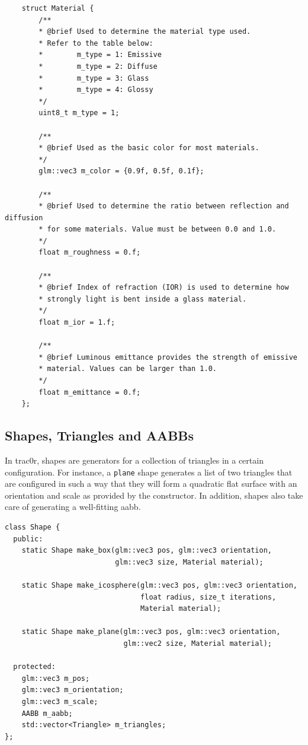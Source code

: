 \documentclass[
  twoside,
  11pt, a4paper,
  footinclude=true,
  headinclude=true,
  cleardoublepage=empty
]{scrreprt}
\begin{document}
\begin{verbatim}
    struct Material {
        /**
        * @brief Used to determine the material type used.
        * Refer to the table below:
        *        m_type = 1: Emissive
        *        m_type = 2: Diffuse
        *        m_type = 3: Glass
        *        m_type = 4: Glossy
        */
        uint8_t m_type = 1;

        /**
        * @brief Used as the basic color for most materials.
        */
        glm::vec3 m_color = {0.9f, 0.5f, 0.1f};

        /**
        * @brief Used to determine the ratio between reflection and diffusion
        * for some materials. Value must be between 0.0 and 1.0.
        */
        float m_roughness = 0.f;

        /**
        * @brief Index of refraction (IOR) is used to determine how
        * strongly light is bent inside a glass material.
        */
        float m_ior = 1.f;

        /**
        * @brief Luminous emittance provides the strength of emissive
        * material. Values can be larger than 1.0.
        */
        float m_emittance = 0.f;
    };
\end{verbatim}
\begingroup
{}
\endgroup

\subsection{Shapes, Triangles and AABBs}

In trac0r, shapes are generators for a collection of triangles in a certain configuration. For
instance, a \texttt{plane} shape generates a list of two triangles that are configured in such a way
that they will form a quadratic flat surface with an orientation and scale as provided by the
constructor. In addition, shapes also take care of generating a well-fitting \ac{aabb}.

\begin{verbatim}
class Shape {
  public:
    static Shape make_box(glm::vec3 pos, glm::vec3 orientation,
                          glm::vec3 size, Material material);

    static Shape make_icosphere(glm::vec3 pos, glm::vec3 orientation,
                                float radius, size_t iterations,
                                Material material);

    static Shape make_plane(glm::vec3 pos, glm::vec3 orientation,
                            glm::vec2 size, Material material);

  protected:
    glm::vec3 m_pos;
    glm::vec3 m_orientation;
    glm::vec3 m_scale;
    AABB m_aabb;
    std::vector<Triangle> m_triangles;
};
\end{verbatim}
\begingroup
{}
\endgroup
\end{document}
